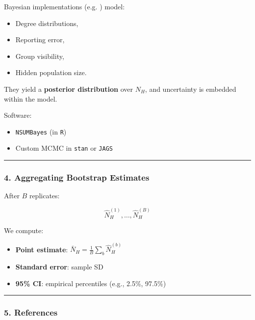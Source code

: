 \documentclass[
  12pt,
  letterpaper,
  DIV=11,
  numbers=noendperiod]{scrartcl}
\theoremstyle{plain}
\theoremstyle{definition}
\begin{document}
Bayesian implementations (e.g. \textcite{malt15-estimating}) model:

\begin{itemize}
\item
  Degree distributions,
\item
  Reporting error,
\item
  Group visibility,
\item
  Hidden population size.
\end{itemize}

They yield a \textbf{posterior distribution} over \(N_H\), and
uncertainty is embedded within the model.

Software:

\begin{itemize}
\item
  \texttt{NSUMBayes} (in \texttt{R})
\item
  Custom MCMC in \texttt{stan} or \texttt{JAGS}
\end{itemize}

\begin{center}\rule{0.5\linewidth}{0.5pt}\end{center}

\subsubsection{4. Aggregating Bootstrap
Estimates}\label{aggregating-bootstrap-estimates}

After \(B\) replicates:

\[\hat{N}_H^{(1)}, \dots, \hat{N}_H^{(B)}\]

We compute:

\begin{itemize}
\item
  \textbf{Point estimate}:
  \(\bar{N}_H = \frac{1}{B} \sum_b \hat{N}_H^{(b)}\)
\item
  \textbf{Standard error}: sample SD
\item
  \textbf{95\% CI}: empirical percentiles (e.g., 2.5\%, 97.5\%)
\end{itemize}

\begin{center}\rule{0.5\linewidth}{0.5pt}\end{center}

\subsubsection{5. References}\label{references-1}
\end{document}
